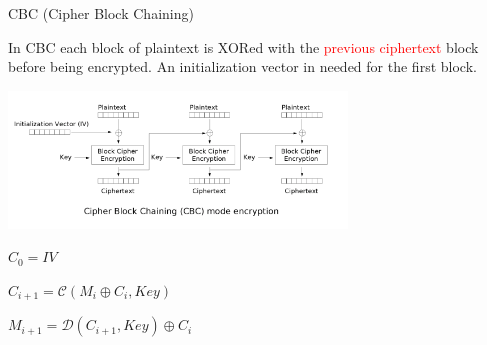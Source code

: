 \begin{frame}{CBC (Cipher Block Chaining)}

In CBC each block of plaintext is XORed with the \textcolor{red}{previous ciphertext} block before being encrypted. An initialization vector in needed for the first block.
 
\medskip

\centerline{\includegraphics[width=9cm]{img/CBC.png}}

\medskip

\phantom{pad}$C_0 = IV$

\phantom{pad}$C_{i+1} = \mathcal{C}(M_i \oplus C_{i}, Key)$

\phantom{pad}$M_{i+1} = \mathcal{D}(C_{i+1}, Key) \oplus C_{i}$
\end{frame}



